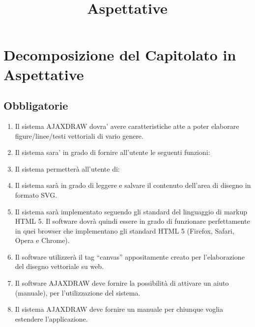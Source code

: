 \documentclass[a4paper]{article}
\begin{document}
\title{Aspettative}

\section{Decomposizione del Capitolato in Aspettative}

\subsection{Obbligatorie}
\begin{enumerate}
\item Il sistema AJAXDRAW dovra' avere caratteristiche atte a poter elaborare figure/linee/testi vettoriali di vario genere.
\item Il sistema sara' in grado di fornire all'utente le seguenti funzioni:


\item Il sistema permetterà all'utente di:


\item Il sistema sarà in grado di leggere e salvare il contenuto dell'area di disegno in formato SVG.
\item Il sistema sarà implementato seguendo gli standard del linguaggio di markup HTML 5. Il software dovrà quindi essere in grado di funzionare perfettamente in quei browser che implementano gli standard HTML 5 (Firefox, Safari, Opera e Chrome). 
\item Il software utilizzerà il tag “canvas” appositamente creato per l'elaborazione del disegno vettoriale su web.
\item Il software AJAXDRAW deve fornire la possibilità di attivare un aiuto (manuale), per l’utilizzazione del sistema. 
\item Il sistema AJAXDRAW deve fornire un manuale per chiunque voglia estendere l'applicazione. 
\end{enumerate}
\end{document}

